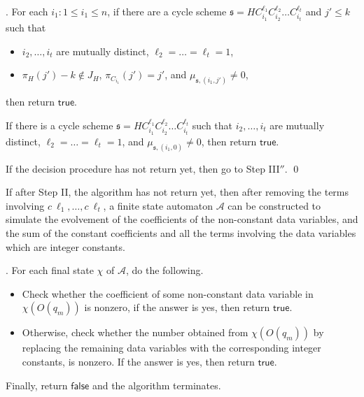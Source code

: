 \documentclass[runningheads,a4paper]{llncs}
\def\Aa{{\mathcal{A} }}
\def\schm{{\mathfrak{s} }}
\newcommand\ltrue{\mathsf{true}}
\newcommand\lfalse{\mathsf{false}}
\begin{document}
\begin{appendix}
\medskip

. For each $i_1: 1 \le i_1 \le n$, if there are a cycle scheme $\schm=HC_{i_1}^{\ell_1} C_{i_2}^{\ell_2} \dots C_{i_t}^{\ell_t}$  and $j' \le k$ such that 
\begin{itemize}
\item $i_2,\dots,i_t$ are mutually distinct, $\ell_2 = \dots = \ell_t = 1$, 
%
\item $\pi_H(j')-k \not \in J_H$, $\pi_{C_{i_1}}(j')=j'$, and $\mu_{\schm,(i_1,j')} \neq 0$, 
\end{itemize}
then return $\ltrue$.

If there is a cycle scheme $\schm=HC_{i_1}^{\ell_1} C_{i_2}^{\ell_2} \dots C_{i_t}^{\ell_t}$ such that 
$i_2,\dots,i_t$ are mutually distinct, $\ell_2 = \dots = \ell_t = 1$, 
%
and $\mu_{\schm,(i_1,0)} \neq 0$, 
%
then return $\ltrue$. 

If the decision procedure has not return yet, then go to Step III$''$. \qed

\medskip

If after Step II, the algorithm has not return yet, then after removing the terms involving $c\ \ell_1,\dots, c\ \ell_t$, a finite state automaton $\Aa$ can be constructed to simulate the evolvement of the coefficients of the non-constant data variables, and the sum of the constant coefficients and all the terms involving the data variables which are integer constants. 

\medskip



. For each final state $\chi$ of $\Aa$, do the following.
\begin{itemize}
\item Check whether the coefficient of some non-constant data variable in $\chi(O(q_m))$ is nonzero, if the answer is yes, then return $\ltrue$.
%
\item Otherwise, check whether the number obtained from $\chi(O(q_m))$ by replacing the remaining data variables with the corresponding integer constants, is nonzero. If the answer is yes, then return $\ltrue$. 
\end{itemize}
Finally, return $\lfalse$ and the algorithm terminates.




\end{appendix}
\end{document}
